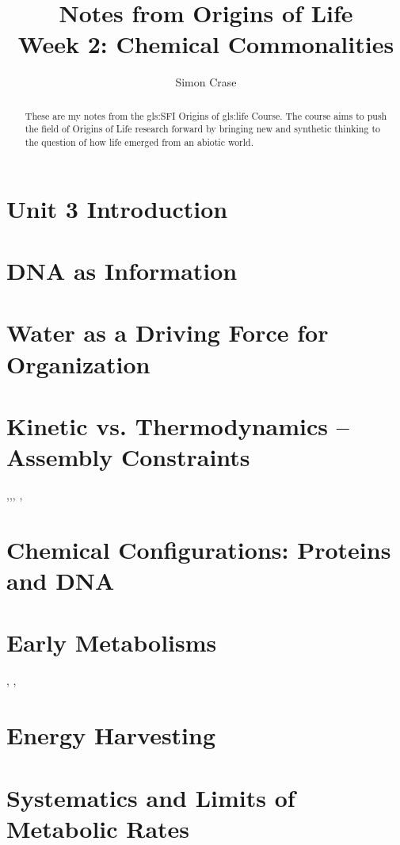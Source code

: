 \documentclass[]{article}
\title{
	Notes from Origins of Life\\
	Week 2: Chemical Commonalities
}
\author{Simon Crase}
\begin{document}
\maketitle

\begin{abstract}
    These are my notes from the \gls{gls:SFI} Origins of \gls{gls:life} Course\cite{sfi2019}. The course aims to push the field of Origins of Life research forward by bringing new and synthetic thinking to the question of how life emerged from an abiotic world.

\end{abstract}

\setcounter{tocdepth}{2}
\tableofcontents


\section{Unit 3 Introduction}

\section{DNA as Information}

\cite{kunkel2004dna}

\section{Water as a Driving Force for Organization}

\cite{ball2017water}

\section{Kinetic vs. Thermodynamics – Assembly Constraints}

\cite{pross2017and},\cite{semenov2016autocatalytic},\cite{pross2008can}, \cite{dee2016comparing},\cite{pross2005emergence}

\section{Chemical Configurations: Proteins and DNA}

\section{Early Metabolisms}
\cite{bar2011survey}, \cite{fuchs2011alternative}, \cite{weiss2016physiology}

\section{Energy Harvesting}

\cite{simon2008organisation}

\section{Systematics and Limits of Metabolic Rates}


\printglossaries

 


\end{document}
